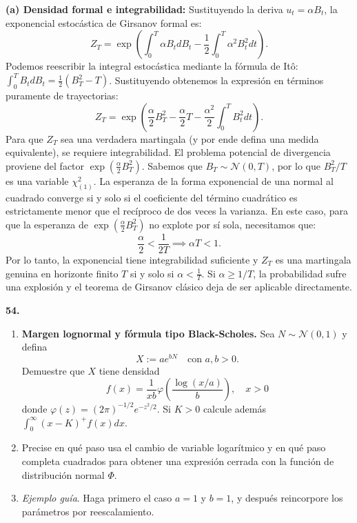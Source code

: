 \documentclass[11pt, letterpaper]{article}
\begin{document}
\begin{solucion}
    \vspace{3mm}
    \textbf{(a) Densidad formal e integrabilidad:}
    Sustituyendo la deriva $u_t = \alpha B_t$, la exponencial estocástica de Girsanov formal es:
    \[ Z_T = \exp\left( \int_0^T \alpha B_t dB_t - \frac{1}{2} \int_0^T \alpha^2 B_t^2 dt \right). \]
    Podemos reescribir la integral estocástica mediante la fórmula de Itô: $\int_0^T B_t dB_t = \frac{1}{2}(B_T^2 - T)$. Sustituyendo obtenemos la expresión en términos puramente de trayectorias:
    \[ Z_T = \exp\left( \frac{\alpha}{2}B_T^2 - \frac{\alpha}{2}T - \frac{\alpha^2}{2} \int_0^T B_t^2 dt \right). \]
    Para que $Z_T$ sea una verdadera martingala (y por ende defina una medida equivalente), se requiere integrabilidad. El problema potencial de divergencia proviene del factor $\exp\left(\frac{\alpha}{2}B_T^2\right)$. Sabemos que $B_T \sim \mathcal{N}(0, T)$, por lo que $B_T^2/T$ es una variable $\chi^2_{(1)}$.
    La esperanza de la forma exponencial de una normal al cuadrado converge si y solo si el coeficiente del término cuadrático es estrictamente menor que el recíproco de dos veces la varianza. En este caso, para que la esperanza de $\exp\left(\frac{\alpha}{2}B_T^2\right)$ no explote por sí sola, necesitamos que:
    \[ \frac{\alpha}{2} < \frac{1}{2T} \implies \alpha T < 1. \]
    Por lo tanto, la exponencial tiene integrabilidad suficiente y $Z_T$ es una martingala genuina en horizonte finito $T$ si y solo si $\alpha < \frac{1}{T}$. Si $\alpha \ge 1/T$, la probabilidad sufre una explosión y el teorema de Girsanov clásico deja de ser aplicable directamente.
\end{solucion}

\newpage

\begin{ejercicio}
    \textbf{54.} 
    \begin{enumerate}
        \item \textbf{Margen lognormal y fórmula tipo Black-Scholes.} Sea $N\sim \mathcal{N}(0,1)$ y defina
        \[ X := a e^{bN} \quad \text{con } a,b>0. \]
        Demuestre que $X$ tiene densidad
        \[ f(x) = \frac{1}{xb}\varphi\left(\frac{\log(x/a)}{b}\right), \quad x > 0 \]
        donde $\varphi(z)=(2\pi)^{-1/2}e^{-z^{2}/2}$. Si $K>0$ calcule además $\int_{0}^{\infty}(x-K)^{+}f(x)dx.$
        \item Precise en qué paso usa el cambio de variable logarítmico y en qué paso completa cuadrados para obtener una expresión cerrada con la función de distribución normal $\Phi$.
        \item \textit{Ejemplo guía}. Haga primero el caso $a=1$ y $b=1$, y después reincorpore los parámetros por reescalamiento.
    \end{enumerate}
\end{ejercicio}
\end{document}
